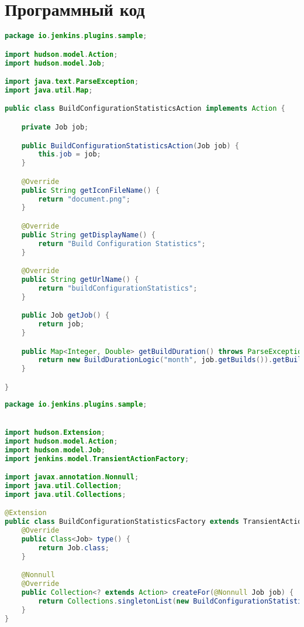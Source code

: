 \chapter{Программный код}\label{appendix-extra-examples}

\begin{lstlisting}[language=Java]
package io.jenkins.plugins.sample;

import hudson.model.Action;
import hudson.model.Job;

import java.text.ParseException;
import java.util.Map;

public class BuildConfigurationStatisticsAction implements Action {

    private Job job;

    public BuildConfigurationStatisticsAction(Job job) {
        this.job = job;
    }

    @Override
    public String getIconFileName() {
        return "document.png";
    }

    @Override
    public String getDisplayName() {
        return "Build Configuration Statistics";
    }

    @Override
    public String getUrlName() {
        return "buildConfigurationStatistics";
    }

    public Job getJob() {
        return job;
    }

    public Map<Integer, Double> getBuildDuration() throws ParseException {
        return new BuildDurationLogic("month", job.getBuilds()).getBuildsDuration();
    }

}
\end{lstlisting}

\begin{lstlisting}[language=Java]
package io.jenkins.plugins.sample;


import hudson.Extension;
import hudson.model.Action;
import hudson.model.Job;
import jenkins.model.TransientActionFactory;

import javax.annotation.Nonnull;
import java.util.Collection;
import java.util.Collections;

@Extension
public class BuildConfigurationStatisticsFactory extends TransientActionFactory<Job> {
    @Override
    public Class<Job> type() {
        return Job.class;
    }

    @Nonnull
    @Override
    public Collection<? extends Action> createFor(@Nonnull Job job) {
        return Collections.singletonList(new BuildConfigurationStatisticsAction(job));
    }
}
\end{lstlisting}


